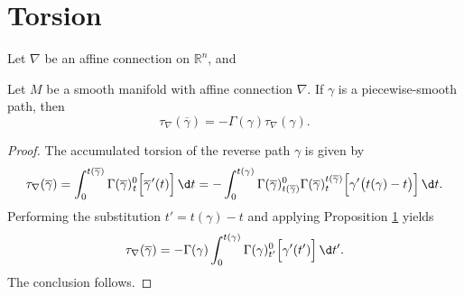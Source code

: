 \section{Torsion}

\begin{theorem}
Let $\nabla$ be an affine connection on $\mathbb{R}^n$, and 
\end{theorem}

\begin{proposition}
  Let $M$ be a smooth manifold with affine connection $\nabla$. If $\gamma$ is a piecewise-smooth path, then 
  \begin{equation}
    \tau_\nabla(\overline{\gamma}) = -\Gamma(\gamma) \tau_\nabla(\gamma).
  \end{equation}
\end{proposition}
\begin{proof}
  The accumulated torsion of the reverse path $\gamma$ is given by
  \begin{equation}
    \tau_\nabla (\overline{\gamma}) = \int_{0}^{t(\overline{\gamma})} \Gamma(\overline{\gamma})_{\hspace{0.5pt}t}^{0} \Big[ \overline{\gamma}\hspace{0.5pt}'(t) \Big] \, \d t = -\int_{0}^{t(\gamma)} \Gamma(\overline{\gamma})_{t(\overline{\gamma})}^{0} \Gamma(\overline{\gamma})_t^{t(\overline{\gamma})}\Big[\gamma'\big(t(\gamma) - t\big)\Big] \, \d t.
  \end{equation}
  Performing the substitution $t' = t(\gamma) - t$ and applying Proposition \ref{} yields
  \begin{equation}
    \tau_\nabla (\overline{\gamma}) = -  \Gamma(\gamma) \int_{0}^{t(\gamma)} \Gamma(\gamma)_{t'}^{0}\Big[\gamma'(t')\Big] \, \d t'.
  \end{equation}
  The conclusion follows.
\end{proof}

